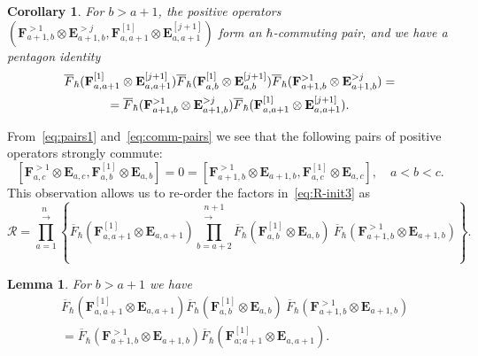 \documentclass[11pt, reqno]{amsart}
\newtheorem{lemma}[theorem]{Lemma}
\newtheorem{cor}[theorem]{Corollary}
\theoremstyle{definition}
\numberwithin{equation}{section}
\def\beq{\begin{equation}}
\def\eeq{\end{equation}}
\newcommand{\hc}[1]{\left\{#1\right\}}                                                  %
\def\Rc{\mathcal R}
\def\stgE{\mathbf{E}}
\def\stgF{\mathbf{F}}
\begin{document}
\begin{cor}
\label{lem:pent2}
For $b>a+1$, the positive operators $(\stgF_{a+1,b}^{>1}\otimes\stgE_{a+1,b}^{>j},\stgF_{a,a+1}^{[1]}\otimes\stgE_{a,a+1}^{[j+1]})$ form an $\hbar$-commuting pair, and we have a pentagon identity
\begin{multline*}
\overline F_\hbar(\stgF^{[1]}_{a,a+1} \otimes \stgE^{[j+1]}_{a,a+1})\overline{F}_\hbar( \stgF^{[1]}_{a,b}\otimes\stgE^{[j+1]}_{a,b})\overline{F}_\hbar( \stgF^{>1}_{a+1,b}\otimes\stgE^{>j}_{a+1,b}) = \\ = \overline{F}_\hbar( \stgF^{>1}_{a+1,b}\otimes\stgE^{>j}_{a+1,b})\overline F_\hbar(\stgF^{[1]}_{a,a+1} \otimes \stgE^{[j+1]}_{a,a+1}).
$$
\end{multline*}
\end{cor}

From~\eqref{eq:pairs1} and~\eqref{eq:comm-pairs} we see that the following pairs of positive operators strongly commute:
$$
 [\stgF^{>1}_{a,c}\otimes\stgE_{a,c},\stgF^{[1]}_{a,b}\otimes\stgE_{a,b}]=0=[\stgF^{>1}_{a+1,b}\otimes\stgE_{a+1,b},\stgF^{[1]}_{a,c}\otimes \stgE_{a,c}], \quad a<b<c.
$$
This observation allows us to re-order the factors in~\eqref{eq:R-init3} as
\beq
\label{eq:R-init4}
\Rc = \prod_{a=1}^{\substack{n \\[-2pt] \longrightarrow}} \hc{ \overline{F}_\hbar( \stgF^{[1]}_{a,a+1} \otimes \stgE_{a,a+1})\prod_{b=a+2}^{\substack{n+1 \\[-2pt] \longrightarrow}}\overline{F}_\hbar( \stgF^{[1]}_{a,b}\otimes\stgE_{a,b}) ~\overline{F}_\hbar( \stgF^{>1}_{a+1,b}\otimes\stgE_{a+1,b})}.
\eeq


\begin{lemma}
\label{lem:1}
For $b>a+1$ we have
\begin{align}
\label{eq:lem-1}
&\overline F_\hbar(\stgF^{[1]}_{a,a+1} \otimes \stgE_{a,a+1}) \overline{F}_\hbar( \stgF^{[1]}_{a,b}\otimes\stgE_{a,b}) ~\overline{F}_\hbar( \stgF^{>1}_{a+1,b}\otimes\stgE_{a+1,b})\\
 &=\overline{F}_\hbar( \stgF^{>1}_{a+1,b}\otimes\stgE_{a+1,b}) \overline F_\hbar(\stgF^{[1]}_{a;a+1} \otimes \stgE_{a,a+1}).
\end{align}
\end{lemma}
\end{document}
